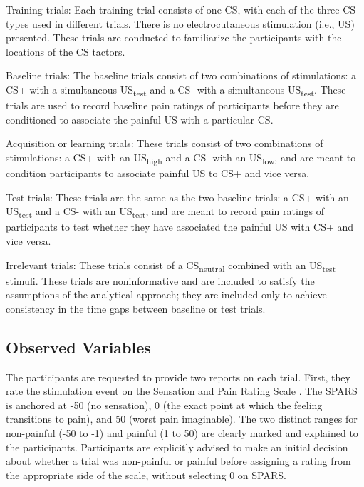 \documentclass[empirical,issue, twocolumn,authordate]{jote-new-article}
\begin{document}
Training trials: Each training trial consists of one CS, with each of the three CS types used in different trials. There is no electrocutaneous stimulation (i.e., US) presented. These trials are conducted to familiarize the participants with the locations of the CS tactors. 

Baseline trials: The baseline trials consist of two combinations of stimulations: a CS+ with a simultaneous US\textsubscript{test} and a CS- with a simultaneous US\textsubscript{test}. These trials are used to record baseline pain ratings of participants before they are conditioned to associate the painful US with a particular CS.

Acquisition or learning trials: These trials consist of two combinations of stimulations: a CS+ with an US\textsubscript{high} and a CS- with an US\textsubscript{low}, and are meant to condition participants to associate painful US to CS+ and vice versa.

Test trials: These trials are the same as the two baseline trials: a CS+ with an US\textsubscript{test} and a CS- with an US\textsubscript{test}, and are meant to record pain ratings of participants to test whether they have associated the painful US with CS+ and vice versa.

Irrelevant trials: These trials consist of a CS\textsubscript{neutral} combined with an US\textsubscript{test} stimuli. These trials are noninformative and are included to satisfy the assumptions of the analytical approach; they are included only to achieve consistency in the time gaps between baseline or test trials. 

\subsection{Observed Variables}

The participants are requested to provide two reports on each trial. First, they rate the stimulation event on the Sensation and Pain Rating Scale \parencite[][SPARS; previously known as FESTNRS;]{Madden2017, Madden2019}. The SPARS is anchored at -50 (no sensation), 0 (the exact point at which the feeling transitions to pain), and 50 (worst pain imaginable). The two distinct ranges for non-painful (-50 to -1) and painful (1 to 50) are clearly marked and explained to the participants. Participants are explicitly advised to make an initial decision about whether a trial was non-painful or painful before assigning a rating from the appropriate side of the scale, without selecting 0 on SPARS. 
\end{document}
